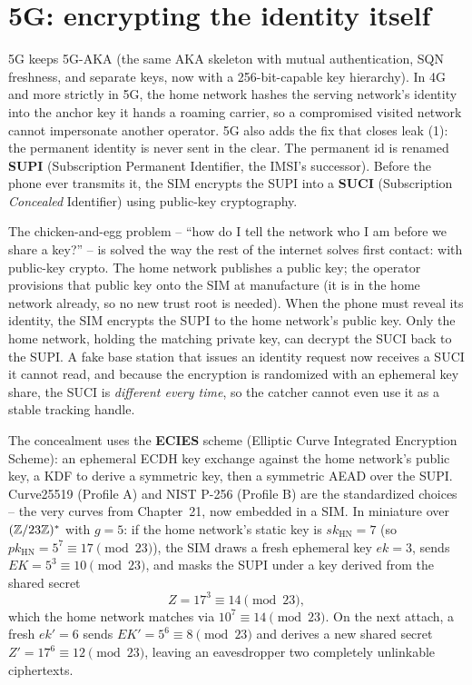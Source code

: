 \section{5G: encrypting the identity itself}
\label{ch29:5g}

5G keeps 5G-AKA (the same AKA skeleton with mutual authentication, SQN freshness, and separate keys, now with a 256-bit-capable key hierarchy). In 4G and more strictly in 5G, the home network hashes the serving network's identity into the anchor key it hands a roaming carrier, so a compromised visited network cannot impersonate another operator. 5G also adds the fix that closes leak (1): the permanent identity is never sent in the clear. The permanent id is renamed \textbf{SUPI} (Subscription Permanent Identifier, the IMSI's successor). Before the phone ever transmits it, the SIM encrypts the SUPI into a \textbf{SUCI} (Subscription \emph{Concealed} Identifier) using public-key cryptography.

\begin{intuitionbox}
The chicken-and-egg problem -- ``how do I tell the network who I am before we share a key?'' -- is solved the way the rest of the internet solves first contact: with public-key crypto. The home network publishes a public key; the operator provisions that public key onto the SIM at manufacture (it is in the home network already, so no new trust root is needed). When the phone must reveal its identity, the SIM encrypts the SUPI to the home network's public key. Only the home network, holding the matching private key, can decrypt the SUCI back to the SUPI. A fake base station that issues an identity request now receives a SUCI it cannot read, and because the encryption is randomized with an ephemeral key share, the SUCI is \emph{different every time}, so the catcher cannot even use it as a stable tracking handle.
\end{intuitionbox}

The concealment uses the \textbf{ECIES} scheme (Elliptic Curve Integrated Encryption Scheme): an ephemeral ECDH key exchange against the home network's public key, a KDF to derive a symmetric key, then a symmetric AEAD over the SUPI. Curve25519 (Profile A) and NIST P-256 (Profile B) are the standardized choices -- the very curves from Chapter~21, now embedded in a SIM. In miniature over $(\mathbb{Z}/23\mathbb{Z})^{*}$ with $g = 5$: if the home network's static key is $sk_{\mathrm{HN}} = 7$ (so $pk_{\mathrm{HN}} = 5^7 \equiv 17 \pmod{23}$), the SIM draws a fresh ephemeral key $ek = 3$, sends $EK = 5^3 \equiv 10 \pmod{23}$, and masks the SUPI under a key derived from the shared secret
\[
  Z = 17^3 \equiv 14 \pmod{23},
\]
which the home network matches via $10^7 \equiv 14 \pmod{23}$. On the next attach, a fresh $ek' = 6$ sends $EK' = 5^6 \equiv 8 \pmod{23}$ and derives a new shared secret $Z' = 17^6 \equiv 12 \pmod{23}$, leaving an eavesdropper two completely unlinkable ciphertexts.

